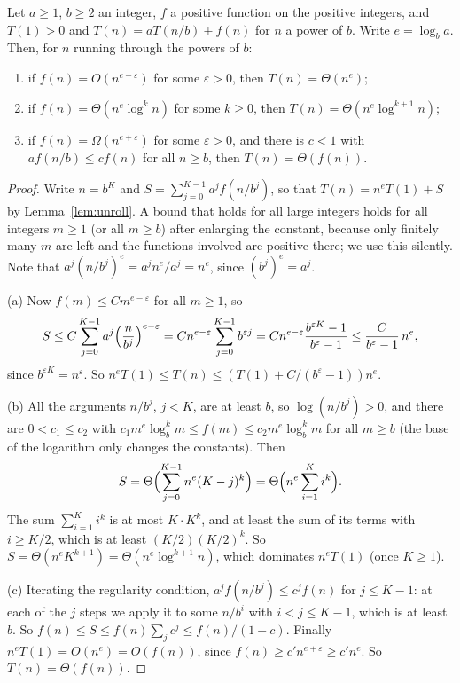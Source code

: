 \begin{theorem}\label{thm:master}
Let $a\ge1$, $b\ge2$ an integer, $f$ a positive function on the positive integers, and $T(1)>0$ and $T(n)=aT(n/b)+f(n)$ for $n$ a power
of $b$. Write $e=\log_ba$. Then, for $n$ running through the powers of $b$:
\begin{enumerate}
\item[(a)] if $f(n)=O(n^{e-\varepsilon})$ for some $\varepsilon>0$, then $T(n)=\Theta(n^e)$;
\item[(b)] if $f(n)=\Theta(n^e\log^kn)$ for some $k\ge0$, then $T(n)=\Theta(n^e\log^{k+1}n)$;
\item[(c)] if $f(n)=\Omega(n^{e+\varepsilon})$ for some $\varepsilon>0$, and there is $c<1$ with $af(n/b)\le cf(n)$ for all $n\ge b$, then
$T(n)=\Theta(f(n))$.
\end{enumerate}
\end{theorem}
\begin{proof}
Write $n=b^K$ and $S=\sum_{j=0}^{K-1}a^jf(n/b^j)$, so that $T(n)=n^eT(1)+S$ by Lemma~\ref{lem:unroll}. A bound that holds for all large
integers holds for all integers $m\ge1$ (or all $m\ge b$) after enlarging the constant, because only finitely many $m$ are left and
the functions involved are positive there; we use this silently. Note that $a^j(n/b^j)^e=a^jn^e/a^j=n^e$, since $(b^j)^e=a^j$.

(a) Now $f(m)\le Cm^{e-\varepsilon}$ for all $m\ge1$, so
\[
S\le C\sum_{j=0}^{K-1}a^j\Bigl(\frac n{b^j}\Bigr)^{e-\varepsilon}=Cn^{e-\varepsilon}\sum_{j=0}^{K-1}b^{\varepsilon j}=Cn^{e-\varepsilon}\frac{b^{\varepsilon K}-1}{b^\varepsilon-1}\le\frac{C}{b^\varepsilon-1}\,n^e,
\]
since $b^{\varepsilon K}=n^\varepsilon$. So $n^eT(1)\le T(n)\le(T(1)+C/(b^\varepsilon-1))n^e$.

(b) All the arguments $n/b^j$, $j<K$, are at least $b$, so $\log(n/b^j)>0$, and there are $0<c_1\le c_2$ with
$c_1m^e\log_b^km\le f(m)\le c_2m^e\log_b^km$ for all $m\ge b$ (the base of the logarithm only changes the constants). Then
\[
S=\Theta\Bigl(\sum_{j=0}^{K-1}n^e(K-j)^k\Bigr)=\Theta\Bigl(n^e\sum_{i=1}^Ki^k\Bigr).
\]
The sum $\sum_{i=1}^Ki^k$ is at most $K\cdot K^k$, and at least the sum of its terms with $i\ge K/2$, which is at least $(K/2)(K/2)^k$. So
$S=\Theta(n^eK^{k+1})=\Theta(n^e\log^{k+1}n)$, which dominates $n^eT(1)$ (once $K\ge1$).

(c) Iterating the regularity condition, $a^jf(n/b^j)\le c^jf(n)$ for $j\le K-1$: at each of the $j$ steps we apply it to some
$n/b^{i}$ with $i<j\le K-1$, which is at least $b$. So $f(n)\le S\le f(n)\sum_jc^j\le f(n)/(1-c)$. Finally
$n^eT(1)=O(n^{e})=O(f(n))$, since $f(n)\ge c'n^{e+\varepsilon}\ge c'n^e$. So $T(n)=\Theta(f(n))$.
\end{proof}

